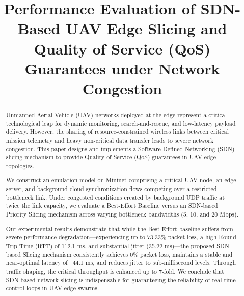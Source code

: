 \documentclass[conference]{IEEEtran}
\begin{document}
\title{Performance Evaluation of SDN-Based UAV Edge Slicing and Quality of Service (QoS) Guarantees under Network Congestion}

\author{
}

\maketitle

\begin{abstract}
Unmanned Aerial Vehicle (UAV) networks deployed at the edge represent a critical technological leap for dynamic monitoring, search-and-rescue, and low-latency payload delivery. However, the sharing of resource-constrained wireless links between critical mission telemetry and heavy non-critical data transfer leads to severe network congestion. This paper designs and implements a Software-Defined Networking (SDN) slicing mechanism to provide Quality of Service (QoS) guarantees in UAV-edge topologies. 

We construct an emulation model on Mininet comprising a critical UAV node, an edge server, and background cloud synchronization flows competing over a restricted bottleneck link. Under congested conditions created by background UDP traffic at twice the link capacity, we evaluate a Best-Effort Baseline versus an SDN-based Priority Slicing mechanism across varying bottleneck bandwidths (5, 10, and 20 Mbps). 

Our experimental results demonstrate that while the Best-Effort baseline suffers from severe performance degradation—experiencing up to 73.33\% packet loss, a high Round-Trip Time (RTT) of 112.1 ms, and substantial jitter (35.22 ms)—the proposed SDN-based Slicing mechanism consistently achieves 0\% packet loss, maintains a stable and near-optimal latency of ~44.1 ms, and reduces jitter to sub-millisecond levels. Through traffic shaping, the critical throughput is enhanced up to 7-fold. We conclude that SDN-based network slicing is indispensable for guaranteeing the reliability of real-time control loops in UAV-edge swarms.
\end{abstract}
\end{document}
